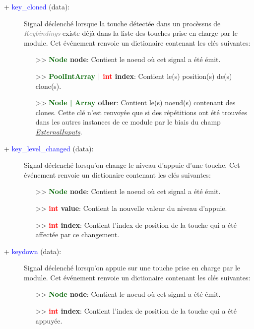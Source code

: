\documentclass[a4paper, 11pt]{article}
\begin{document}
	\begin{description}
		\item [+ \textcolor{blue}{key\_cloned} (data):] Signal déclenché lorsque la touche détectée dans un 
		procèssus de \textcolor{gray}{\textit{\\Keybindings}} existe déjà dans la liste des touches prise en 
		charge par le module. Cet événement renvoie un dictionaire contenant les clés suivantes:
		\begin{itemize}
			\item [>> \textbf{\textcolor{darkgreen}{Node} node}:] Contient le noeud où cet signal a été 
			émit.
			\item [>> \textbf{\textcolor{darkgreen}{PoolIntArray} | \textcolor{red}{int} index}:] Contient 
			le(s) position(s) de(s) clone(s).
			\item [>> \textbf{\textcolor{darkgreen}{Node | Array} other}:] Contient le(s) noeud(s) contenant 
			des clones. Cette clé n'est renvoyée que si des répétitions ont été trouvées dans les autres 
			instances de ce module par le biais du champ \textit{\hyperlink{extinp}{ExternalInputs}}.\\
		\end{itemize}
	\end{description}
	\begin{description}
		\item [+ \textcolor{blue}{key\_level\_changed} (data):] Signal déclenché lorsqu'on change le niveau 
		d'appuie d'une touche. Cet événement renvoie un dictionaire contenant les clés suivantes:
		\begin{itemize}
			\item [>> \textbf{\textcolor{darkgreen}{Node} node}:] Contient le noeud où cet signal a été 
			émit.
			\item [>> \textbf{\textcolor{red}{int} value}:] Contient la nouvelle valeur du niveau d'appuie.
			\item [>> \textbf{\textcolor{red}{int} index}:] Contient l'index de position de la touche qui a 
			été affectée par ce changement.\\
		\end{itemize}
	\end{description}
	\begin{description}
		\item [+ \textcolor{blue}{keydown} (data):] Signal déclenché lorsqu'on appuie sur une touche prise 
		en charge par le \\module. Cet événement renvoie un dictionaire contenant les clés suivantes:
		\begin{itemize}
			\item [>> \textbf{\textcolor{darkgreen}{Node} node}:] Contient le noeud où cet signal a été 
			émit.
			\item [>> \textbf{\textcolor{red}{int} index}:] Contient l'index de position de la touche qui a 
			été appuyée.\\
		\end{itemize}
	\end{description}
\end{document}
